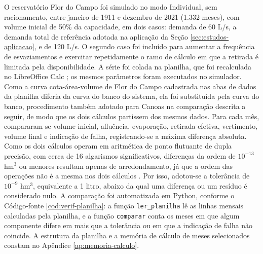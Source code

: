O reservatório Flor do Campo foi simulado no modo Individual, sem racionamento, entre janeiro de 1911 e dezembro de 2021 (1.332 meses), com volume inicial de 50\% da capacidade, em dois casos: demanda de 60 L/s, a demanda total de referência adotada na aplicação da Seção \ref{sec:estudos-aplicacao}, e de 120 L/s. O segundo caso foi incluído para aumentar a frequência de esvaziamentos e exercitar repetidamente o ramo de cálculo em que a retirada é limitada pela disponibilidade. A série foi colada na planilha, que foi recalculada no LibreOffice Calc \cite{libreoffice}; os mesmos parâmetros foram executados no simulador. Como a curva cota-área-volume de Flor do Campo cadastrada nas abas de dados da planilha diferia da curva do banco do sistema, ela foi substituída pela curva do banco, procedimento também adotado para Canoas na comparação descrita a seguir, de modo que os dois cálculos partissem dos mesmos dados. Para cada mês, compararam-se volume inicial, afluência, evaporação, retirada efetiva, vertimento, volume final e indicação de falha, registrando-se a máxima diferença absoluta. Como os dois cálculos operam em aritmética de ponto flutuante de dupla precisão, com cerca de 16 algarismos significativos, diferenças da ordem de $10^{-13}$ hm$^3$ ou menores resultam apenas de arredondamento, já que a ordem das operações não é a mesma nos dois cálculos \cite{goldberg1991}. Por isso, adotou-se a tolerância de $10^{-9}$ hm$^3$, equivalente a 1 litro, abaixo da qual uma diferença ou um resíduo é considerado nulo. A comparação foi automatizada em Python, conforme o Código-fonte \ref{cod:verif-planilha}: a função \texttt{ler\_planilha} lê as linhas mensais calculadas pela planilha, e a função \texttt{comparar} conta os meses em que algum componente difere em mais que a tolerância ou em que a indicação de falha não coincide. A estrutura da planilha e a memória de cálculo de meses selecionados constam no Apêndice \ref{ap:memoria-calculo}.

